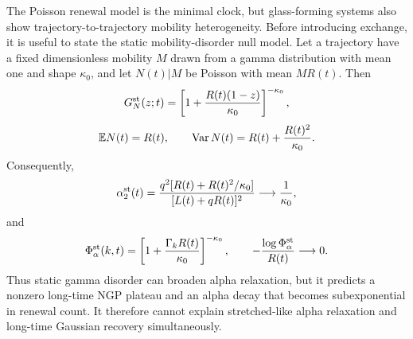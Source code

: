 \documentclass[aps,preprint,onecolumn,superscriptaddress,nofootinbib]{revtex4-2}
\begin{document}
The Poisson renewal model is the minimal clock, but glass-forming systems also
show trajectory-to-trajectory mobility heterogeneity. Before introducing
exchange, it is useful to state the static mobility-disorder null model. Let a
trajectory have a fixed dimensionless mobility $M$ drawn from a gamma
distribution with mean one and shape $\kappa_0$, and let
$N(t)|M$ be Poisson with mean $MR(t)$. Then
\begin{equation}
  G_N^{\rm st}(z;t)=
  \left[1+\frac{R(t)(1-z)}{\kappa_0}\right]^{-\kappa_0},
\end{equation}
\begin{equation}
  \mathbb{E}N(t)=R(t),\qquad
  {\rm Var}\,N(t)=R(t)+\frac{R(t)^2}{\kappa_0}.
\end{equation}
Consequently,
\begin{equation}
  \alpha_2^{\rm st}(t)=
  \frac{q^2[R(t)+R(t)^2/\kappa_0]}{[L(t)+qR(t)]^2}
  \longrightarrow \frac{1}{\kappa_0},
\end{equation}
and
\begin{equation}
  \Phi_\alpha^{\rm st}(k,t)=
  \left[1+\frac{\Gamma_kR(t)}{\kappa_0}\right]^{-\kappa_0},
  \qquad
  -\frac{\log\Phi_\alpha^{\rm st}}{R(t)}\longrightarrow0.
\end{equation}
Thus static gamma disorder can broaden alpha relaxation, but it predicts a
nonzero long-time NGP plateau and an alpha decay that becomes subexponential in
renewal count. It therefore cannot explain stretched-like alpha relaxation and
long-time Gaussian recovery simultaneously.
\end{document}
